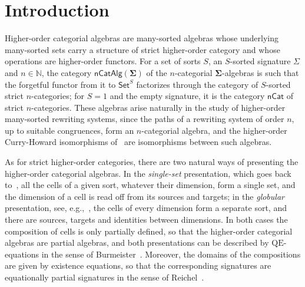 \documentclass[a4paper, reqno
]{amsart}
\newcommand{\sig}[1]{\mathbf{#1}}             %
\newcommand{\QE}{\mathrm{QE}}
\theoremstyle{plain}
\theoremstyle{definition}
\begin{document}
\section{Introduction}\label{SIntroduction}

Higher-order categorial algebras are many-sorted algebras whose underlying many-sorted sets carry a structure of strict higher-order category and whose operations are higher-order functors.
For a set of sorts $S$, an $S$-sorted signature $\Sigma$ and $n\in\mathbb{N}$, the category $\mathsf{nCatAlg}(\sig{\Sigma})$ of the $n$-categorial $\sig{\Sigma}$-algebras is such that the forgetful functor from it to $\mathsf{Set}^{S}$ factorizes through the category of $S$-sorted strict $n$-categories; for $S=1$ and the empty signature, it is the category $\mathsf{nCat}$ of strict $n$-categories.
These algebras arise naturally in the study of higher-order many-sorted rewriting systems, since the paths of a rewriting system of order $n$, up to suitable congruences, form an $n$-categorial algebra, and the higher-order Curry-Howard isomorphisms of~\cite{CVCLRM26} are isomorphisms between such algebras.

As for strict higher-order categories, there are two natural ways of presenting the higher-order categorial algebras.
In the \emph{single-set} presentation, which goes back to~\cite{Str87}, all the cells of a given sort, whatever their dimension, form a single set, and the dimension of a cell is read off from its sources and targets; in the \emph{globular} presentation, see, e.g.,~\cite{abgmmm23}, the cells of every dimension form a separate sort, and there are sources, targets and identities between dimensions.
In both cases the composition of cells is only partially defined, so that the higher-order categorial algebras are partial algebras, and both presentations can be described by $\QE$-equations in the sense of Burmeister~\cite{pb86, pb02}.
Moreover, the domains of the compositions are given by existence equations, so that the corresponding signatures are equationally partial signatures in the sense of Reichel~\cite{Rei87}.
\end{document}
